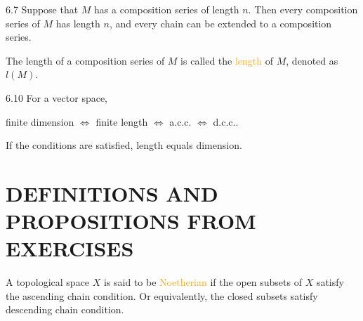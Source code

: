 \begin{proposition}{6.7}
	Suppose that $M$ has a composition series of length $n$. Then every composition series of $M$ has length $n$, and every chain can be extended to a composition series.
\end{proposition}

The length of a composition series of $M$ is called the \textcolor{orange}{length} of $M$, denoted as $l(M)$.

\begin{proposition}{6.10}
	For a vector space, 
	\begin{center}
		finite dimension $\Longleftrightarrow$ finite length $\Longleftrightarrow$ a.c.c. $\Longleftrightarrow$ d.c.c..
	\end{center}
	If the conditions are satisfied, length equals dimension.
\end{proposition}

\section*{DEFINITIONS AND PROPOSITIONS FROM EXERCISES}

A topological space $X$ is said to be \textcolor{orange}{Noetherian} if the open subsets of $X$ satisfy the ascending chain condition. Or equivalently, the closed subsets satisfy descending chain condition.